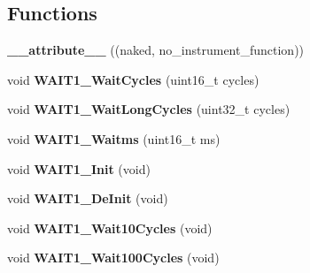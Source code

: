 \subsection*{Functions}
\begin{DoxyCompactItemize}
\item 
\hypertarget{group___w_a_i_t1__module_ga0d401ca6ca297b5b7a450deed0c42b78}{{\bfseries \-\_\-\-\_\-attribute\-\_\-\-\_\-} ((naked, no\-\_\-instrument\-\_\-function))}\label{group___w_a_i_t1__module_ga0d401ca6ca297b5b7a450deed0c42b78}

\item 
\hypertarget{group___w_a_i_t1__module_ga2ef0c866b014b3f8bba49508c79a4c21}{void {\bfseries W\-A\-I\-T1\-\_\-\-Wait\-Cycles} (uint16\-\_\-t cycles)}\label{group___w_a_i_t1__module_ga2ef0c866b014b3f8bba49508c79a4c21}

\item 
\hypertarget{group___w_a_i_t1__module_gad800b2446f397d9524bf1780d2646a57}{void {\bfseries W\-A\-I\-T1\-\_\-\-Wait\-Long\-Cycles} (uint32\-\_\-t cycles)}\label{group___w_a_i_t1__module_gad800b2446f397d9524bf1780d2646a57}

\item 
\hypertarget{group___w_a_i_t1__module_ga04b03075f856862ff2bc4ff69825aeb6}{void {\bfseries W\-A\-I\-T1\-\_\-\-Waitms} (uint16\-\_\-t ms)}\label{group___w_a_i_t1__module_ga04b03075f856862ff2bc4ff69825aeb6}

\item 
\hypertarget{group___w_a_i_t1__module_ga3bb855c4f83a70665404289e66b8f2a7}{void {\bfseries W\-A\-I\-T1\-\_\-\-Init} (void)}\label{group___w_a_i_t1__module_ga3bb855c4f83a70665404289e66b8f2a7}

\item 
\hypertarget{group___w_a_i_t1__module_ga8024b107f0d8d25c88974c6a709b1f88}{void {\bfseries W\-A\-I\-T1\-\_\-\-De\-Init} (void)}\label{group___w_a_i_t1__module_ga8024b107f0d8d25c88974c6a709b1f88}

\item 
\hypertarget{group___w_a_i_t1__module_gaff67df7b318b8d5cf4555a24fe7c7f93}{void {\bfseries W\-A\-I\-T1\-\_\-\-Wait10\-Cycles} (void)}\label{group___w_a_i_t1__module_gaff67df7b318b8d5cf4555a24fe7c7f93}

\item 
\hypertarget{group___w_a_i_t1__module_gaa9a9a87e96edf43071b5f322cfa72333}{void {\bfseries W\-A\-I\-T1\-\_\-\-Wait100\-Cycles} (void)}\label{group___w_a_i_t1__module_gaa9a9a87e96edf43071b5f322cfa72333}

\end{DoxyCompactItemize}


